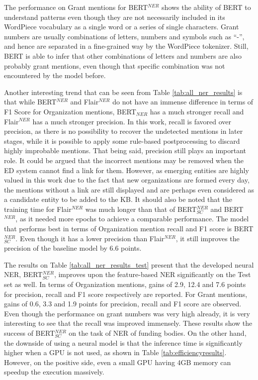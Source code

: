 \documentclass{report}
\theoremstyle{definition}
\theoremstyle{remark}
\begin{document}
The performance on Grant mentions for BERT$^{NER}$ shows the ability of BERT to understand patterns even though they are not necessarily included in its WordPiece vocabulary as a single word or a series of single characters. Grant numbers are usually combinations of letters, numbers and symbols such as ``-'', and hence are separated in a fine-grained way by the WordPiece tokenizer.  Still, BERT is able to infer that other combinations of letters and numbers are also probably grant mentions, even though that specific combination was not encountered by the model before.

Another interesting trend that can be seen from Table \ref{tab:all_ner_results} is that while BERT$^{NER}$ and Flair$^{NER}$ do not have an immense difference in terms of F1 Score for Organization mentions, BERT$_{NER}$ has a much stronger recall and Flair$^{NER}$ has a much stronger precision. In this work, recall is favored over precision, as there is no possibility to recover the undetected mentions in later stages, while it is possible to apply some rule-based postprocessing to discard highly improbable mentions. That being said, precision still plays an important role. It could be argued that the incorrect mentions may be removed when the ED system cannot find a link for them. However, as emerging entities are highly valued in this work due to the fact that new organizations are formed every day, the mentions without a link are still displayed and are perhaps even considered as a candidate entity to be added to the KB. It should also be noted that the training time for Flair$^{NER}$ was much longer than that of BERT$^{NER}_{SC}$ and BERT$^{NER}$, as it needed more epochs to achieve a comparable performance. The model that performs best in terms of Organization mention recall and F1 score is BERT$^{NER}_{SC}$. Even though it has a lower precision than Flair$^{NER}$, it still improves the precision of the baseline model by 6.6 points.   

The results on Table \ref{tab:all_ner_results_test} present that the developed neural NER, BERT$_{SC}^{NER}$, improves upon the feature-based NER significantly on the Test set as well. In terms of Organization mentions, gains of 2.9, 12.4 and 7.6 points for precision, recall and F1 score respectively are reported. For Grant mentions, gains of 0.6, 3.3 and 1.9 points for precision, recall and F1 score are observed. Even though the performance on grant numbers was very high already, it is very interesting to see that the recall was improved immensely. These results show the success of BERT$^{NER}_{SC}$ on the task of NER of funding bodies. On the other hand, the downside of using a neural model is that the inference time is significantly higher when a GPU is not used, as shown in Table \ref{tab:efficiencyresults}. However, on the positive side, even a small GPU having 4GB memory can speedup the execution massively.
\end{document}
